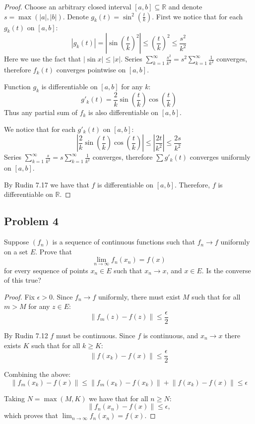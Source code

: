\documentclass{article}
\newcommand{\R}{\mathbb{R}}
\newcommand{\norm}[1]{\left\lVert #1 \right\rVert}
\begin{document}
\begin{proof}

Choose an arbitrary closed interval $[a,b] \subseteq \R$ and denote $s = \max(|a|,|b|)$.
Denote $g_k(t) = \sin^2 \left( \frac{t}{k} \right)$. First we notice that for each $g_k(t)$ on $[a,b]$:
\[ |g_k(t)| = \left| \sin \left( \frac{t}{k} \right)^2 \right| \leq \left( \frac{t}{k} \right)^2 \leq \frac{s^2}{k^2} \]
Here we use the fact that $|\sin x| \leq |x|$.
Series $\sum_{k=1}^{\infty} \frac{s^2}{k^2} = s^2 \sum_{k=1}^{\infty} \frac{1}{k^2}$ converges, therefore $f_k(t)$ converges pointwise on $[a,b]$.

Function $g_k$ is differentiable on $[a,b]$ for any $k$:
\[ g'_k(t) = \frac{2}{k} \sin \left( \frac{t}{k} \right) \cos \left( \frac{t}{k} \right) \]
Thus any partial sum of $f_k$ is also differentiable on $[a,b]$.

We notice that for each $g'_k(t)$ on $[a,b]$:
\[
\left| \frac{2}{k} \sin \left( \frac{t}{k} \right) \cos \left( \frac{t}{k} \right) \right| \leq \left| \frac{2t}{k^2} \right| \leq \frac{2s}{k^2}
\]
Series $\sum_{k=1}^{\infty} \frac{s}{k^2} = s \sum_{k=1}^{\infty} \frac{1}{k^2}$ converges, therefore $\sum g'_k(t)$ converges uniformly on $[a,b]$.

By Rudin 7.17 we have that $f$ is differentiable on $[a,b]$. Therefore, $f$ is differentiable on $\R$.

\end{proof}


\subsection*{Problem 4}

\begin{tcolorbox}
Suppose $(f_n)$ is a sequence of continuous functions such that $f_n \to f$ uniformly on a set $E$. Prove that
\[ \lim_{n \to \infty} f_n(x_n) = f(x) \]
for every sequence of points $x_n \in E$ such that $x_n \to x$, and $x \in E$. Is the converse of this true?
\end{tcolorbox}

\begin{proof}

Fix $\epsilon>0$. Since $f_n \to f$ uniformly, there must exist $M$ such that for all $m>M$ for any $z \in E$:
\[ \norm{ f_m(z) - f(z) } \leq \frac{\epsilon}{2} \]

By Rudin 7.12 $f$ must be continuous. Since $f$ is continuous, and $x_n \to x$ there exists $K$ such that for all $k \geq K$:
\[ \norm{ f(x_k) - f(x) } \leq \frac{\epsilon}{2} \]

Combining the above:
\[ \norm{ f_m(x_k) - f(x) } \leq \norm{ f_m(x_k) - f(x_k) } + \norm{ f(x_k) - f(x) } \leq \epsilon \]

Taking $N = \max(M,K)$ we have that for all $n \geq N$:
\[ \norm{ f_n(x_n) - f(x) } \leq \epsilon, \]
which proves that $\lim_{n \to \infty} f_n(x_n) = f(x)$.

\end{proof}
\end{document}
